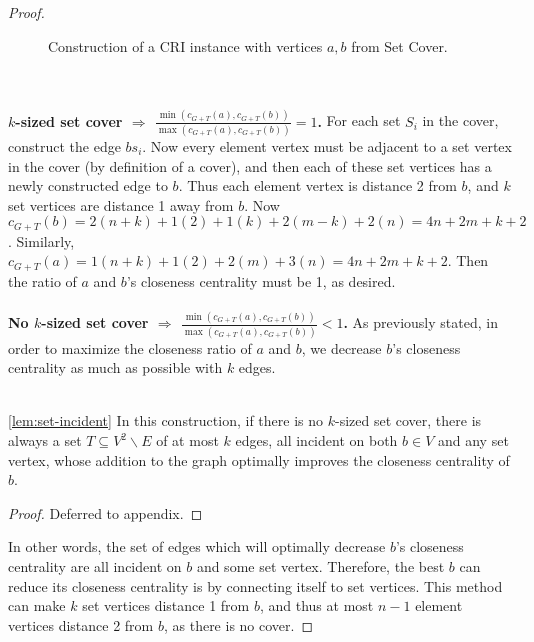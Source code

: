 \begin{proof}
\begin{figure}
    \caption{Construction of a CRI instance with vertices $a,b$ from Set Cover.}
    \end{figure}\\\\
    \textbf{$k$-sized set cover $\Longrightarrow$ $\frac{\min(c_{G+T}(a),c_{G+T}(b))}{\max(c_{G+T}(a),c_{G+T}(b))}=1$.} For each set $S_i$ in the cover, construct the edge $bs_i$. Now every element vertex must be adjacent to a set vertex in the cover (by definition of a cover), and then each of these set vertices has a newly constructed edge to $b$. Thus each element vertex is distance 2 from $b$, and $k$ set vertices are distance 1 away from $b$. Now $c_{G+T}(b)=2(n+k)+1(2)+1(k)+2(m-k)+2(n)=4n+2m+k+2$. Similarly, $c_{G+T}(a)=1(n+k)+1(2)+2(m)+3(n)=4n+2m+k+2$. Then the ratio of $a$ and $b$'s closeness centrality must be 1, as desired.\\\\
    \textbf{No $k$-sized set cover $\Longrightarrow$ $\frac{\min(c_{G+T}(a),c_{G+T}(b))}{\max(c_{G+T}(a),c_{G+T}(b))}<1$.} As previously stated, in order to maximize the closeness ratio of $a$ and $b$, we decrease $b$'s closeness centrality as much as possible with $k$ edges.\\\\
    \begin{lemma}\ref{lem:set-incident}
        In this construction, if there is no $k$-sized set cover, there is always a set $T\subseteq V^2\backslash E$ of at most $k$ edges, all incident on both $b\in V$ and any set vertex, whose addition to the graph optimally improves the closeness centrality of $b$.
    \end{lemma}
    \begin{proof}
        Deferred to appendix.
    \end{proof}
    \noindent
    In other words, the set of edges which will optimally decrease $b$'s closeness centrality are all incident on $b$ and some set vertex. Therefore, the best $b$ can reduce its closeness centrality is by connecting itself to set vertices. This method can make $k$ set vertices distance 1 from $b$, and thus at most $n-1$ element vertices distance 2 from $b$, as there is no cover. 


\end{proof}
